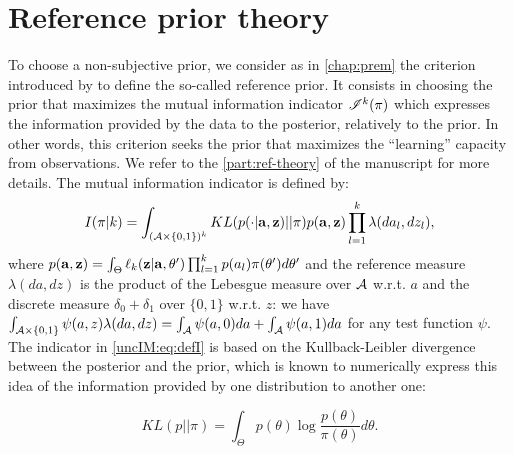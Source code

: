 \section{Reference prior theory} \label{uncIM:sec:objprior}

    To choose a non-subjective prior, we consider as in \cref{chap:prem} the criterion introduced by \citet{bernardo_expected_1979} to define the so-called reference prior. It consists in choosing the prior that maximizes the mutual information indicator $\mathscr{I}^k(\pi)$ which expresses the information provided by the data to the posterior, relatively to the prior. In other words, this criterion seeks the prior that maximizes the ``learning'' capacity from observations. We refer to the \cref{part:ref-theory} of the manuscript for more details. The mutual information indicator is defined by:
    \begin{equation}
        I(\pi|k)=\int_{(\mathcal{A}\times \{0,1\})^k} KL(p(\cdot|\mathbf{a},\mathbf{z})||\pi)p(\mathbf{a},\mathbf{z})\prod_{l=1}^k \lambda(da_l,dz_l),
         \label{uncIM:eq:defI}
    \end{equation}
    where $p(\mathbf{a},\mathbf{z}) = \int_{\Theta} \ell_k(\mathbf{z}|\mathbf{a},\theta' ) \prod_{l=1}^kp(a_l) \pi(\theta')d\theta'$ and the reference measure $\lambda(da,dz)$ is the product of the Lebesgue measure over $\mathcal{A}$ w.r.t. $a$ and the discrete measure $\delta_0+\delta_1$ over $\{0,1\}$ w.r.t. $z$: we have $\int_{ \mathcal{A} \times \{0,1\}} \psi(a,z)\lambda(da,dz) = \int_{\cal A} \psi(a,0) da+\int_{\cal A} \psi(a,1) da$ for any test function $\psi$.
The indicator in \cref{uncIM:eq:defI} is based on the Kullback-Leibler divergence between the posterior and the prior, which is known to numerically express this idea of the information provided by one distribution to another one: 
    
    \begin{equation}
        KL(p||\pi)=\int_{\Theta} p(\theta)\log\frac{p(\theta)}{\pi(\theta)} d \theta.
         \label{uncIM:eq:defKL}
    \end{equation}

